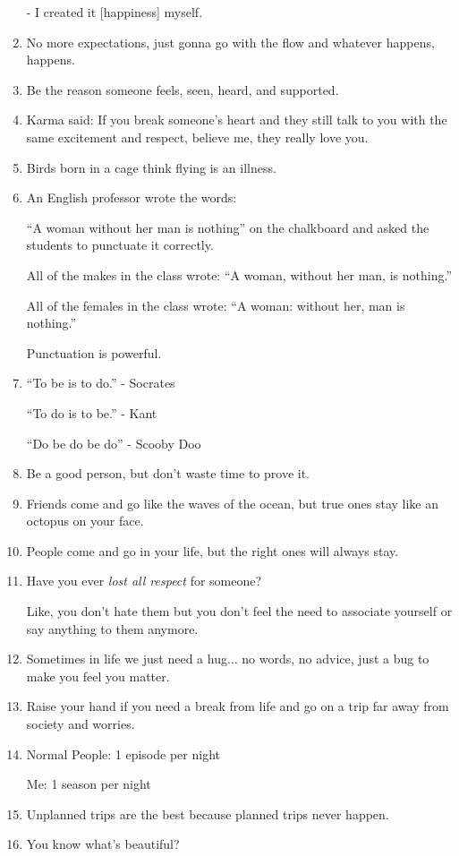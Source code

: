 \documentclass{article}
\begin{document}
\begin{enumerate}
	- I created it [happiness] myself.
	\item No more expectations, just gonna go with the flow and whatever happens, happens.
	\item Be the reason someone feels, seen, heard, and supported.
	\item Karma said: If you break someone's heart and they still talk to you with the same excitement and respect, believe me, they really love you.
	\item Birds born in a cage think flying is an illness.
	\item An English professor wrote the words:
	
	``A woman without her man is nothing'' on the chalkboard and asked the students to punctuate it correctly.
	
	All of the makes in the class wrote: ``A woman, without her man, is nothing.''
	
	All of the females in the class wrote: ``A woman: without her, man is nothing.''
	
	Punctuation is powerful.
	\item ``To be is to do.'' - Socrates
	
	``To do is to be.'' - Kant
	
	``Do be do be do'' - Scooby Doo
	\item Be a good person, but don't waste time to prove it.
	\item Friends come and go like the waves of the ocean, but true ones stay like an octopus on your face.
	\item People come and go in your life, but the right ones will always stay.
	\item Have you ever \textit{lost all respect} for someone?
	
	Like, you don't hate them but you don't feel the need to associate yourself or say anything to them anymore.
	\item Sometimes in life we just need a hug$\ldots$ no words, no advice, just a bug to make you feel you matter.
	\item Raise your hand if you need a break from life and go on a trip far away from society and worries.
	\item Normal People: 1 episode per night
	
	Me: 1 season per night
	\item Unplanned trips are the best because planned trips never happen.
	\item You know what's beautiful?
	

\end{enumerate}
\end{document}
